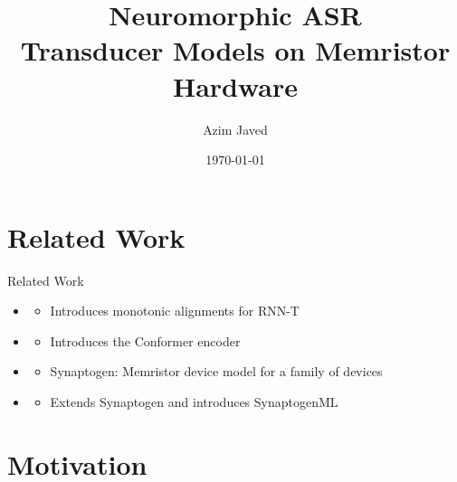 \documentclass[xcolor=table,mathserif,9pt,usepdftitle=false]{beamer}    %
\title[Neuromorphic ASR]{Neuromorphic ASR \\ \large Transducer Models on Memristor Hardware}
\author[A. Javed]{Azim Javed}
\institute[RWTH Aachen University] %
{
 \vspace{20px} 
 \strut Human Language Technology and Pattern Recognition\\
 \strut Computer Science Department, RWTH Aachen University
}
\date{\today}
\begin{document}
\begin{frame}[label=titlepage]
  \titlepage
\end{frame}


\section{Related Work}

\begin{frame}{Related Work}
  \begin{itemize}
    \item {} \cite{tripathi2019monotonic}
          \begin{itemize}
            \item Introduces monotonic alignments for RNN-T
          \end{itemize}
    \item {} \cite{Gulati+Qin+:2020conformer}
          \begin{itemize}
            \item Introduces the Conformer encoder
          \end{itemize}
    \item {} \cite{hennen2024synaptogen}
          \begin{itemize}
            \item Synaptogen: Memristor device model for a family of devices
          \end{itemize}
    \item {} \cite{rossenbach2025memristor}
          \begin{itemize}
            \item Extends Synaptogen and introduces SynaptogenML
          \end{itemize}
  \end{itemize}
\end{frame}

\section{Motivation}
\end{document}
